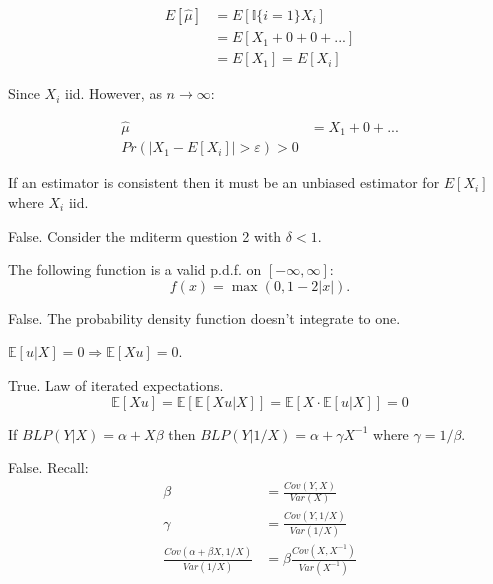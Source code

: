 \documentclass{exam}
\begin{document}
\begin{questions}
\begin{solution}
        \begin{align*}
            E[\hat{\mu}] &= E[\mathbb{I}\{i = 1\}X_i]  \\
            &= E[X_1 + 0 + 0 + ...] \\
            &= E[X_1] = E[X_i]
        \end{align*}

        Since $X_i$ iid. However, as $n \rightarrow \infty$:

        \begin{align*}
            \hat{\mu} &= X_1 + 0 + ... \\
            Pr(|X_1 - E[X_i]| > \varepsilon) > 0
        \end{align*}
    \end{solution}


    \question If an estimator is consistent then it must be an unbiased estimator 
    for $E[X_i]$ where $X_i$ iid.


    \begin{solution}
    False. Consider the mditerm question 2 with $\delta < 1$.        



    \end{solution}


	\question The following function is a valid p.d.f. on $[-\infty, \infty]$:
		\[    f(x) = \max(0, 1 - 2 |x| ). \]

		\begin{solution}
		    False. The probability density function doesn't integrate to one.
		\end{solution}



    \question
    $\mathbb{E}[u|X] {=} 0 \Rightarrow \mathbb{E}[Xu] {=} 0$.
    \begin{solution}
    True. Law of iterated expectations. $$\mathbb{E}[X u] = \mathbb{E}[\mathbb{E}[X u|X]] = \mathbb{E}[X \cdot \mathbb{E}[u|X]] = 0$$
    \end{solution}

    \question If $BLP(Y | X) = \alpha + X \beta$ then $BLP(Y | 1/X) = \alpha +  \gamma X^{-1}$ where 
    $\gamma = 1/\beta$.
\begin{solution}
    
    False.
    Recall:
    \begin{align*}
        \beta &= \frac{Cov(Y, X)}{Var(X)} \\
        \gamma &= \frac{Cov(Y, 1/X)}{Var(1/X)} \\
        \frac{Cov(\alpha + \beta X, 1/X)}{Var(1/X)} &= \beta \frac{Cov(X, X^{-1})}{Var(X^{-1})} \\
    \end{align*}



\end{solution}
\end{questions}
\end{document}
